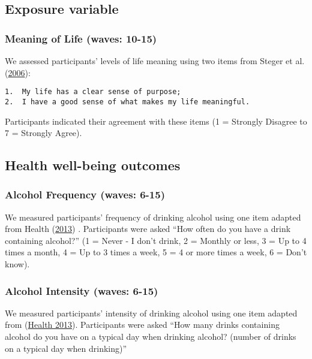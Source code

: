 \documentclass[
  singlecolumn]{report}
\begin{document}
\hypertarget{exposure-variable}{%
\subsection{Exposure variable}\label{exposure-variable}}

\hypertarget{meaning-of-life-waves-10-15}{%
\subsubsection{Meaning of Life (waves:
10-15)}\label{meaning-of-life-waves-10-15}}

We assessed participants' levels of life meaning using two items from
Steger et al. (\protect\hyperlink{ref-steger_meaning_2006}{2006}):

\begin{verbatim}
1.  My life has a clear sense of purpose;
2.  I have a good sense of what makes my life meaningful.
\end{verbatim}

Participants indicated their agreement with these items (1 = Strongly
Disagree to 7 = Strongly Agree).

\hypertarget{health-well-being-outcomes}{%
\subsection{Health well-being
outcomes}\label{health-well-being-outcomes}}

\hypertarget{alcohol-frequency-waves-6-15}{%
\subsubsection{Alcohol Frequency (waves:
6-15)}\label{alcohol-frequency-waves-6-15}}

We measured participants' frequency of drinking alcohol using one item
adapted from Health
(\protect\hyperlink{ref-Ministry_of_Health_2013}{2013}) . Participants
were asked ``How often do you have a drink containing alcohol?'' (1 =
Never - I don't drink, 2 = Monthly or less, 3 = Up to 4 times a month, 4
= Up to 3 times a week, 5 = 4 or more times a week, 6 = Don't know).

\hypertarget{alcohol-intensity-waves-6-15}{%
\subsubsection{Alcohol Intensity (waves:
6-15)}\label{alcohol-intensity-waves-6-15}}

We measured participants' intensity of drinking alcohol using one item
adapted from (\protect\hyperlink{ref-Ministry_of_Health_2013}{Health
2013}). Participants were asked ``How many drinks containing alcohol do
you have on a typical day when drinking alcohol? (number of drinks on a
typical day when drinking)''
\end{document}
